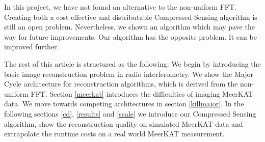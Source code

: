 In this project, we have not found an alternative to the non-uniform FFT. 
Creating both a cost-effective and distributable Compressed Sensing algorithm is still an open problem. 
Nevertheless, we shown an algorithm which may pave the way for future improvements.
Our algorithm has the opposite problem. It can be improved further. 

The rest of this article is structured as the following: We begin by introducing the basic image reconstruction problem in radio interferometry. We show the Major Cycle architecture for reconstruction algorithms, which is derived from the non-uniform FFT.  Section \ref{meerkat} introduces the difficulties of imaging MeerKAT data. We  move towards competing architectures in section \ref{killmajor}. In the following sections \ref{cd}, \ref{results} and \ref{scale} we introduce our Compressed Sensing algorithm, show the reconstruction quality on simulated MeerKAT data and extrapolate the runtime costs on a real world MeerKAT measurement.










